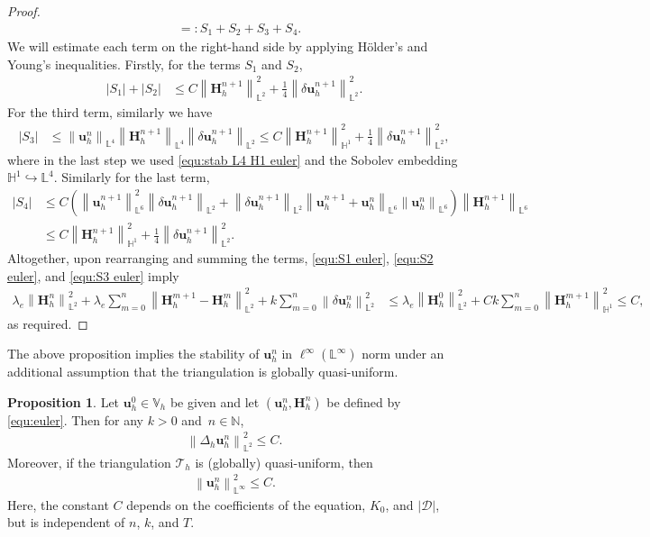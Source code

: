 \documentclass[11pt, reqno]{amsart}
\theoremstyle{definition}
\newtheorem{proposition}[theorem]{Proposition}
\theoremstyle{remark}
\numberwithin{equation}{section}
\newcommand{\bff}{\boldsymbol}
\newcommand{\bb}{\mathbb}
\newcommand{\norm}[2]{\left\|{#1}\right\|_{#2}}
\begin{document}
\begin{proof}
\begin{align*}
		&=:S_1+S_2+S_3+S_4.
	\end{align*}
	We will estimate each term on the right-hand side by applying H\"older's and Young's inequalities. Firstly, for the terms $S_1$ and $S_2$,
	\begin{align}\label{equ:S1 euler}
		|S_1| + |S_2|
		&\leq 
		C \norm{\bff{H}_h^{n+1}}{\bb{L}^2}^2 
		+ 
		\frac{1}{4} \norm{\delta \bff{u}_h^{n+1}}{\bb{L}^2}^2.
	\end{align}
	For the third term, similarly we have
	\begin{align}\label{equ:S2 euler}
		|S_3|
		&\leq
		\norm{\bff{u}_h^n}{\bb{L}^4} \norm{\bff{H}_h^{n+1}}{\bb{L}^4} \norm{\delta \bff{u}_h^{n+1}}{\bb{L}^2}
		\leq
		C \norm{\bff{H}_h^{n+1}}{\bb{H}^1}^2
		+ 
		\frac{1}{4} \norm{\delta \bff{u}_h^{n+1}}{\bb{L}^2}^2,
	\end{align}
	where in the last step we used \eqref{equ:stab L4 H1 euler} and the Sobolev embedding $\bb{H}^1 \hookrightarrow \bb{L}^4$. Similarly for the last term,
	\begin{align}\label{equ:S3 euler}
		\nonumber
		|S_4|
		&\leq
		C \left( \norm{\bff{u}_h^{n+1}}{\bb{L}^6}^2 \norm{\delta \bff{u}_h^{n+1}}{\bb{L}^2} + \norm{\delta \bff{u}_h^{n+1}}{\bb{L}^2} \norm{\bff{u}_h^{n+1}+\bff{u}_h^n}{\bb{L}^6} \norm{\bff{u}_h^n}{\bb{L}^6} \right) \norm{\bff{H}_h^{n+1}}{\bb{L}^6}
		\\
		&\leq
		C \norm{\bff{H}_h^{n+1}}{\bb{H}^1}^2 
		+
		\frac{1}{4} \norm{\delta \bff{u}_h^{n+1}}{\bb{L}^2}^2.
	\end{align}
	Altogether, upon rearranging and summing the terms, \eqref{equ:S1 euler}, \eqref{equ:S2 euler}, and \eqref{equ:S3 euler} imply
	\begin{align*}
		\lambda_e \norm{\bff{H}_h^n}{\bb{L}^2}^2
		+
		\lambda_e \sum_{m=0}^n \norm{\bff{H}_h^{m+1}-\bff{H}_h^m}{\bb{L}^2}^2
		+
		k \sum_{m=0}^n \norm{\delta \bff{u}_h^n}{\bb{L}^2}^2
		&\leq
		\lambda_e \norm{\bff{H}_h^0}{\bb{L}^2}^2
		+
		Ck \sum_{m=0}^n \norm{\bff{H}_h^{m+1}}{\bb{H}^1}^2
		\leq C,
	\end{align*}
	as required.
\end{proof}

The above proposition implies the stability of $\bff{u}_h^n$ in $\ell^\infty(\bb{L}^\infty)$ norm under an additional assumption that the triangulation is globally quasi-uniform.

\begin{proposition}
	Let $\bff{u}_h^0 \in \bb{V}_h$ be given and let $\left(\bff{u}_h^n, \bff{H}_h^n\right)$ be defined by \eqref{equ:euler}. Then for any $k>0$ and~$n\in \bb{N}$,
	\begin{align}\label{equ:stab Delta uh euler}
		\norm{\Delta_h \bff{u}_h^n}{\bb{L}^2}^2 \leq C.
	\end{align}
	Moreover, if the triangulation $\mathcal{T}_h$ is (globally) quasi-uniform, then
	\begin{align}\label{equ:stab uh L infty euler}
		\norm{\bff{u}_h^n}{\bb{L}^\infty}^2 \leq C.
	\end{align}
	Here, the constant $C$ depends on the coefficients of the equation, $K_0$, and $|\mathscr{D}|$, but is independent of $n$, $k$, and $T$.
\end{proposition}
\end{document}
